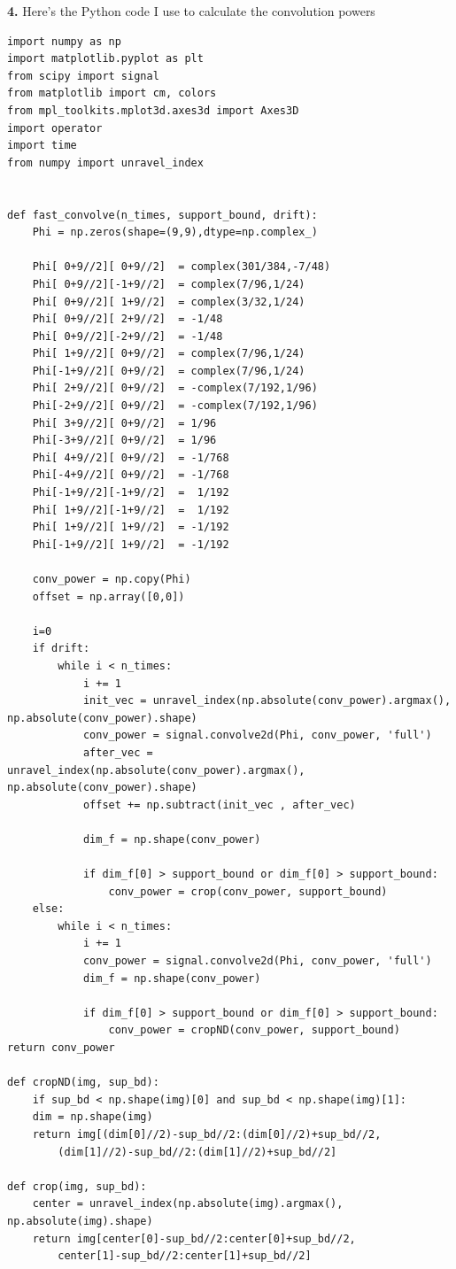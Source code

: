 \documentclass{article}
\theoremstyle{definition}
\begin{document}
\noindent \textbf{4.} Here's the Python code I use to calculate the convolution powers
\begin{lstlisting}
import numpy as np
import matplotlib.pyplot as plt
from scipy import signal
from matplotlib import cm, colors
from mpl_toolkits.mplot3d.axes3d import Axes3D
import operator
import time
from numpy import unravel_index


def fast_convolve(n_times, support_bound, drift):
	Phi = np.zeros(shape=(9,9),dtype=np.complex_)

	Phi[ 0+9//2][ 0+9//2]  = complex(301/384,-7/48)
	Phi[ 0+9//2][-1+9//2]  = complex(7/96,1/24)     
	Phi[ 0+9//2][ 1+9//2]  = complex(3/32,1/24)      
	Phi[ 0+9//2][ 2+9//2]  = -1/48               
	Phi[ 0+9//2][-2+9//2]  = -1/48
	Phi[ 1+9//2][ 0+9//2]  = complex(7/96,1/24)
	Phi[-1+9//2][ 0+9//2]  = complex(7/96,1/24)
	Phi[ 2+9//2][ 0+9//2]  = -complex(7/192,1/96)
	Phi[-2+9//2][ 0+9//2]  = -complex(7/192,1/96)
	Phi[ 3+9//2][ 0+9//2]  = 1/96
	Phi[-3+9//2][ 0+9//2]  = 1/96
	Phi[ 4+9//2][ 0+9//2]  = -1/768
	Phi[-4+9//2][ 0+9//2]  = -1/768
	Phi[-1+9//2][-1+9//2]  =  1/192
	Phi[ 1+9//2][-1+9//2]  =  1/192
	Phi[ 1+9//2][ 1+9//2]  = -1/192
	Phi[-1+9//2][ 1+9//2]  = -1/192

	conv_power = np.copy(Phi)
	offset = np.array([0,0])

	i=0
	if drift:
		while i < n_times:
			i += 1
			init_vec = unravel_index(np.absolute(conv_power).argmax(), np.absolute(conv_power).shape)
			conv_power = signal.convolve2d(Phi, conv_power, 'full')
			after_vec = unravel_index(np.absolute(conv_power).argmax(), np.absolute(conv_power).shape)
			offset += np.subtract(init_vec , after_vec)

			dim_f = np.shape(conv_power)
	
			if dim_f[0] > support_bound or dim_f[0] > support_bound:
				conv_power = crop(conv_power, support_bound)
	else:
		while i < n_times:
			i += 1
			conv_power = signal.convolve2d(Phi, conv_power, 'full')
			dim_f = np.shape(conv_power)

			if dim_f[0] > support_bound or dim_f[0] > support_bound:
				conv_power = cropND(conv_power, support_bound)
return conv_power

def cropND(img, sup_bd):
	if sup_bd < np.shape(img)[0] and sup_bd < np.shape(img)[1]:
	dim = np.shape(img)
	return img[(dim[0]//2)-sup_bd//2:(dim[0]//2)+sup_bd//2,
		(dim[1]//2)-sup_bd//2:(dim[1]//2)+sup_bd//2]

def crop(img, sup_bd):
	center = unravel_index(np.absolute(img).argmax(), np.absolute(img).shape)
	return img[center[0]-sup_bd//2:center[0]+sup_bd//2,
		center[1]-sup_bd//2:center[1]+sup_bd//2]


\end{lstlisting}
\end{document}
